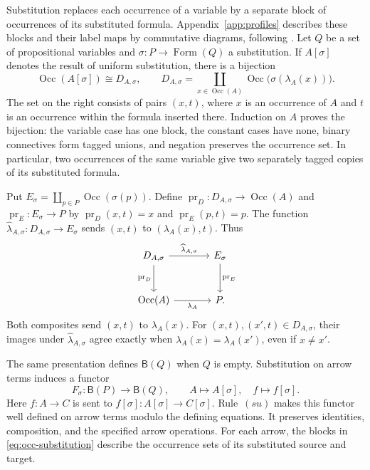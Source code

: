 \documentclass[11pt]{article}
\newcommand{\B}{\mathsf B}
\newcommand{\Occ}{\operatorname{Occ}}
\newcommand{\FormulaSet}{\operatorname{Form}}
\begin{document}
Substitution replaces each occurrence of a variable by a separate
block of occurrences of its substituted formula.
Appendix~\ref{app:profiles} describes these blocks and their label maps
by commutative diagrams, following \cite[\S9]{Notation}.
Let $Q$ be a set of propositional variables and
$\sigma:P\to\FormulaSet(Q)$ a substitution. If $A[\sigma]$ denotes the
result of uniform substitution, there is a bijection
\begin{equation}
 \Occ(A[\sigma])\cong D_{A,\sigma},\qquad
 D_{A,\sigma}=\coprod_{x\in\Occ(A)}
                  \Occ\bigl(\sigma(\lambda_A(x))\bigr).
 \label{eq:occ-substitution}
\end{equation}
The set on the right consists of pairs $(x,t)$, where $x$ is an
occurrence of $A$ and $t$ is an occurrence within the formula inserted there.
Induction on $A$ proves the bijection: the variable case has one
block, the constant cases have none, binary connectives form tagged
unions, and negation preserves the occurrence set. In particular,
two occurrences of the same variable give two separately tagged
copies of its substituted formula.

Put $E_\sigma=\coprod_{p\in P}\Occ(\sigma(p))$.
Define $\operatorname{pr}_D:D_{A,\sigma}\to\Occ(A)$ and
$\operatorname{pr}_E:E_\sigma\to P$ by
$\operatorname{pr}_D(x,t)=x$ and $\operatorname{pr}_E(p,t)=p$.
The function
$\widehat\lambda_{A,\sigma}:D_{A,\sigma}\to E_\sigma$ sends
$(x,t)$ to $(\lambda_A(x),t)$. Thus
\begin{equation}
\begin{tikzcd}[column sep=large,row sep=large]
 D_{A,\sigma}\arrow[r,"\widehat\lambda_{A,\sigma}"]
   \arrow[d,"\operatorname{pr}_D"']
   &E_\sigma\arrow[d,"\operatorname{pr}_E"]\\
 \Occ(A)\arrow[r,"\lambda_A"']&P.
\end{tikzcd}
\label{eq:block-square}
\end{equation}
Both composites send $(x,t)$ to $\lambda_A(x)$.
For $(x,t),(x',t)\in D_{A,\sigma}$, their images under
$\widehat\lambda_{A,\sigma}$ agree exactly when
$\lambda_A(x)=\lambda_A(x')$, even if $x\ne x'$.

The same presentation defines $\B(Q)$ when $Q$ is empty.
Substitution on arrow terms induces a functor
\[
 F_\sigma:\B(P)\longrightarrow\B(Q),\qquad
 A\longmapsto A[\sigma],\quad f\longmapsto f[\sigma].
\]
Here $f:A\to C$ is sent to
$f[\sigma]:A[\sigma]\to C[\sigma]$.
Rule~$(su)$ makes this functor well defined on arrow terms modulo the
defining equations. It preserves identities, composition, and the
specified arrow operations. For each arrow, the blocks in
\eqref{eq:occ-substitution} describe the occurrence sets of its
substituted source and target.
\end{document}

